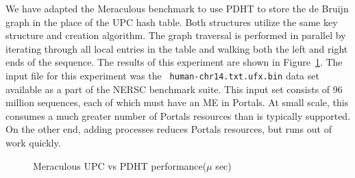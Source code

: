 We have adapted the Meraculous benchmark to use PDHT to store the de Bruijn
graph in the place of the UPC hash table. Both structures utilize the same key
structure and creation algorithm. The graph traversal is performed in parallel
by iterating through all local entries in the table and walking both the left
and right ends of the sequence. The results of this experiment are shown in
Figure~\ref{fig:meraculous}. The input file for this experiment was the {\tt
  human-chr14.txt.ufx.bin} data set available as a part of the NERSC benchmark
suite. This input set consists of 96 million sequences, each of which must have
an ME in Portals. At small scale, this consumes a much greater number of
Portals resources than is typically supported. On the other end, adding 
processes reduces Portals resources, but runs out of work quickly.

\begin{figure}[ht]
  \center
  \fbox{\rule{2.5in}{0pt}\rule[-2.5in]{0pt}{4ex}}  
  \caption{Meraculous UPC vs PDHT performance($\mu$ sec)}
  \label{fig:meraculous}
\end{figure}


